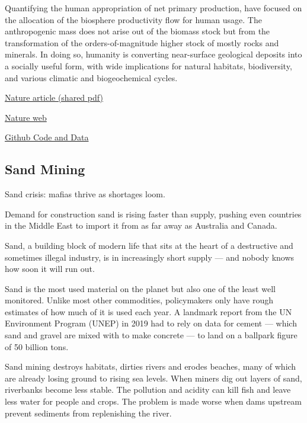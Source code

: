 \documentclass[
]{book}
\begin{document}
Quantifying the human appropriation of net primary production,
have focused on the allocation of the biosphere productivity flow for human usage.
The anthropogenic mass does not arise out of the biomass stock but from
the transformation of the orders-of-magnitude higher stock of mostly rocks and minerals.
In doing so, humanity is converting near-surface geological deposits into a socially useful form,
with wide implications for natural habitats, biodiversity, and various climatic and
biogeochemical cycles.

\href{https://www.nature.com/articles/s41586-020-3010-5.epdf?sharing_token=5BfrjXKSdktry3fKS7ssCdRgN0jAjWel9jnR3ZoTv0MLvUZ1C0L35yEQYHf_pwmiKx-xqIzWDg-_bH8WmUJdQjqDv1hJIWjUwOgpVde7Oc47mU9HfjoCpd8F0qewoXmjl6QNLlUMD2eeD21ompdgtw3j2FQ9z0hhBzCsqewC9BUQNhgBo5rYNFnTf9gTg419kTld3VXUhXOFlygv007wkcA8jVVlyrBd14KL3O0lNyCW54cq4jSFDWqF63iJKDWo_R6M1MFwDWk6OSU79I8W9ga2hbL-jY7gNoOR9LOhqUfR2c1P5oQrsITBs9UtutQEh--2BsxnLatS_s9_H68tUNKvlSYLF9xHfwWb-DXmoouJXov9L4EbWJH6itdSZHqa\&tracking_referrer=www.theguardian.com}{Nature article (shared pdf)}

\href{https://www.nature.com/articles/s41586-020-3010-5}{Nature web}

\href{https://github.com/milo-lab/anthropogenic_mass}{Github Code and Data}

\hypertarget{sand-mining}{%
\subsection{Sand Mining}\label{sand-mining}}

Sand crisis: mafias thrive as shortages loom.

Demand for construction sand is rising faster than supply, pushing even countries in the Middle East to import it from as far away as Australia and Canada.

Sand, a building block of modern life that sits at the heart of a destructive and sometimes illegal industry, is in increasingly short supply --- and nobody knows how soon it will run out.

Sand is the most used material on the planet but also one of the least well monitored. Unlike most other commodities, policymakers only have rough estimates of how much of it is used each year. A landmark report from the UN Environment Program (UNEP) in 2019 had to rely on data for cement --- which sand and gravel are mixed with to make concrete --- to land on a ballpark figure of 50 billion tons.

Sand mining destroys habitats, dirties rivers and erodes beaches, many of which are already losing ground to rising sea levels. When miners dig out layers of sand, riverbanks become less stable. The pollution and acidity can kill fish and leave less water for people and crops. The problem is made worse when dams upstream prevent sediments from replenishing the river.
\end{document}
